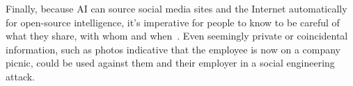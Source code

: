 Finally, because AI can source social media sites and the Internet automatically for open-source intelligence, it's imperative for people to know to be careful of what they share, with whom and when~\citep{mitnick_The_Art_of_Deception_2003}. Even seemingly private or coincidental information, such as photos indicative that the employee is now on a company picnic, could be used against them and their employer in a social engineering attack.
